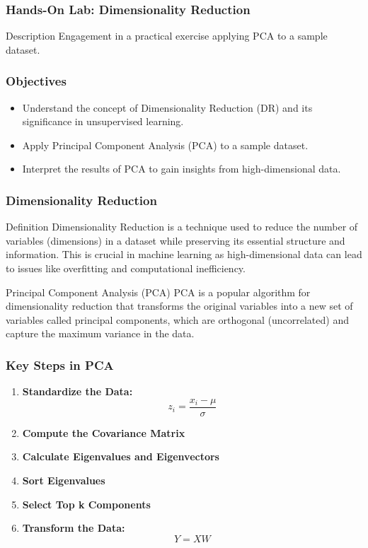 \documentclass[aspectratio=169]{beamer}
\begin{document}
\begin{frame}
    \frametitle{Hands-On Lab: Dimensionality Reduction}
    \begin{block}{Description}
        Engagement in a practical exercise applying PCA to a sample dataset.
    \end{block}
\end{frame}

\begin{frame}
    \frametitle{Objectives}
    \begin{itemize}
        \item Understand the concept of Dimensionality Reduction (DR) and its significance in unsupervised learning.
        \item Apply Principal Component Analysis (PCA) to a sample dataset.
        \item Interpret the results of PCA to gain insights from high-dimensional data.
    \end{itemize}
\end{frame}

\begin{frame}
    \frametitle{Dimensionality Reduction}
    \begin{block}{Definition}
        Dimensionality Reduction is a technique used to reduce the number of variables (dimensions) in a dataset while preserving its essential structure and information. This is crucial in machine learning as high-dimensional data can lead to issues like overfitting and computational inefficiency.
    \end{block}

    \begin{block}{Principal Component Analysis (PCA)}
        PCA is a popular algorithm for dimensionality reduction that transforms the original variables into a new set of variables called principal components, which are orthogonal (uncorrelated) and capture the maximum variance in the data.
    \end{block}
\end{frame}

\begin{frame}
    \frametitle{Key Steps in PCA}
    \begin{enumerate}
        \item \textbf{Standardize the Data:}
        \[
        z_i = \frac{x_i - \mu}{\sigma}
        \]
        \item \textbf{Compute the Covariance Matrix}
        \item \textbf{Calculate Eigenvalues and Eigenvectors}
        \item \textbf{Sort Eigenvalues}
        \item \textbf{Select Top k Components}
        \item \textbf{Transform the Data:}
        \[
        Y = XW
        \]
    \end{enumerate}
\end{frame}
\end{document}

